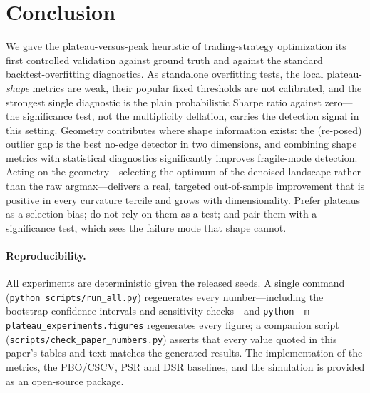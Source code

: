 \documentclass[11pt]{article}
\begin{document}
\section{Conclusion}

We gave the plateau-versus-peak heuristic of trading-strategy optimization its
first controlled validation against ground truth and against the standard
backtest-overfitting diagnostics. As standalone overfitting tests, the local
plateau-\emph{shape} metrics are weak, their popular fixed thresholds are not
calibrated, and the strongest single diagnostic is the plain probabilistic
Sharpe ratio against zero---the significance test, not the multiplicity
deflation, carries the detection signal in this setting. Geometry contributes
where shape information exists: the (re-posed) outlier gap is the best no-edge
detector in two dimensions, and combining shape metrics with statistical
diagnostics significantly improves fragile-mode detection. Acting on the
geometry---selecting the optimum of the denoised landscape rather than the raw
argmax---delivers a real, targeted out-of-sample improvement that is positive in
every curvature tercile and grows with dimensionality. Prefer plateaus as a
selection bias; do not rely on them as a test; and pair them with a significance
test, which sees the failure mode that shape cannot.

\paragraph{Reproducibility.} All experiments are deterministic given the
released seeds. A single command (\texttt{python scripts/run\_all.py})
regenerates every number---including the bootstrap confidence intervals and
sensitivity checks---and \texttt{python -m plateau\_experiments.figures}
regenerates every figure; a companion script
(\texttt{scripts/check\_paper\_numbers.py}) asserts that every value quoted in
this paper's tables and text matches the generated results. The implementation
of the metrics, the PBO/CSCV, PSR and DSR baselines, and the simulation is
provided as an open-source package.

\small


\end{document}
